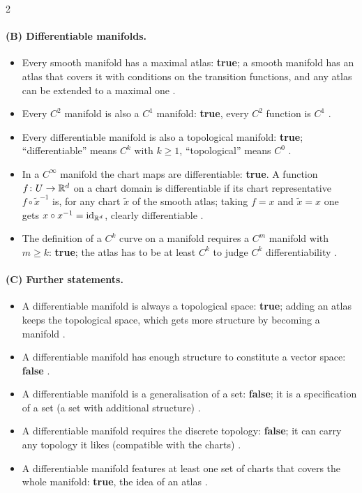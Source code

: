 \begin{paracol}{2}
\paragraph{(B) Differentiable manifolds.}
\begin{itemize}
  \item Every smooth manifold has a maximal atlas: \textbf{true}; a smooth manifold has an atlas that covers it with conditions on the transition functions, and any atlas can be extended to a maximal one .
  \item Every $C^2$ manifold is also a $C^1$ manifold: \textbf{true}, every $C^2$ function is $C^1$ .
  \item Every differentiable manifold is also a topological manifold: \textbf{true}; ``differentiable'' means $C^k$ with $k\ge1$, ``topological'' means $C^0$ .
  \item In a $C^\infty$ manifold the chart maps are differentiable: \textbf{true}. A function $f\colon U\to\mathbb{R}^d$ on a chart domain is differentiable if its chart representative $f\circ\tilde x^{-1}$ is, for any chart $\tilde x$ of the smooth atlas; taking $f=x$ and $\tilde x=x$ one gets $x\circ x^{-1}=\mathrm{id}_{\mathbb{R}^d}$, clearly differentiable
        .
  \item The definition of a $C^k$ curve on a manifold requires a $C^m$ manifold with $m\ge k$: \textbf{true}; the atlas has to be at least $C^k$ to judge $C^k$ differentiability .
\end{itemize}

\paragraph{(C) Further statements.}
\begin{itemize}
  \item A differentiable manifold is always a topological space: \textbf{true}; adding an atlas keeps the topological space, which gets more structure by becoming a manifold .
  \item A differentiable manifold has enough structure to constitute a vector space: \textbf{false} .
  \item A differentiable manifold is a generalisation of a set: \textbf{false}; it is a specification of a set (a set with additional structure) .
  \item A differentiable manifold requires the discrete topology: \textbf{false}; it can carry any topology it likes (compatible with the charts) .
  \item A differentiable manifold features at least one set of charts that covers the whole manifold: \textbf{true}, the idea of an atlas .
\end{itemize}


\end{paracol}
